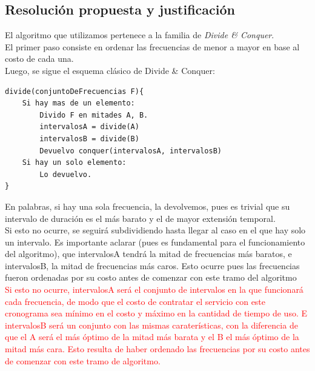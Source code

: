 \newpage

\subsection{Resoluci\'on propuesta y justificaci\'on}

El algoritmo que utilizamos pertenece a la familia de \emph{Divide \& Conquer}.\\


El primer paso consiste en ordenar las frecuencias de menor a mayor en base al costo de cada una.\\

Luego, se sigue el esquema cl\'asico de Divide \& Conquer:\\

	\begin{codesnippet}
	\begin{verbatim}
divide(conjuntoDeFrecuencias F){
    Si hay mas de un elemento:
        Divido F en mitades A, B.
        intervalosA = divide(A)
        intervalosB = divide(B)
        Devuelvo conquer(intervalosA, intervalosB)
    Si hay un solo elemento:
        Lo devuelvo.	
}
	\end{verbatim}
	\end{codesnippet}

En palabras, si hay una sola frecuencia, la devolvemos, pues es trivial que su intervalo de duraci\'on es el m\'as barato y el de mayor extensi\'on temporal.\\

Si esto no ocurre, se seguirá subdividiendo hasta llegar al caso en el que hay solo un intervalo.
Es importante aclarar (pues es fundamental para el funcionamiento del algoritmo), que intervalosA tendrá la mitad de frecuencias más baratos, e intervalosB, la mitad de frecuencias más caros. Esto ocurre pues las frecuencias fueron ordenadas por su costo antes de comenzar con este tramo del algoritmo\\

\textcolor{red}{Si esto no ocurre, intervalosA ser\'a el conjunto de intervalos en la que funcionar\'a cada frecuencia, de modo que el costo de contratar el servicio con este cronograma sea m\'inimo en el costo y m\'aximo en la cantidad de tiempo de uso. E intervalosB ser\'a un conjunto con las mismas carater\'isticas, con la diferencia de que el A ser\'a el m\'as \'optimo de la mitad m\'as barata y el B el m\'as \'optimo de la mitad m\'as cara. Esto resulta de haber ordenado las frecuencias por su costo antes de comenzar con este tramo de algoritmo.}\\


